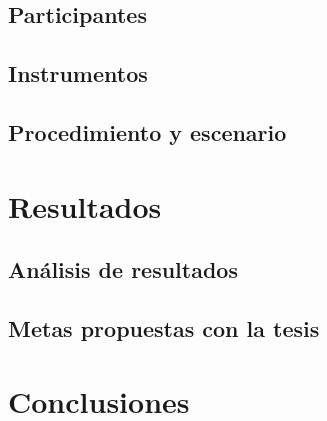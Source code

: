 \documentclass[12pt,letterpaper,spanish]{article}
\begin{document}
\subsection{Participantes}
\subsection{Instrumentos}
\subsection{Procedimiento y escenario}
\newpage

\section{Resultados}
\subsection{Análisis de resultados}
\subsection{Metas propuestas con la tesis}

\newpage
\section{Conclusiones}

\newpage



\end{document}
